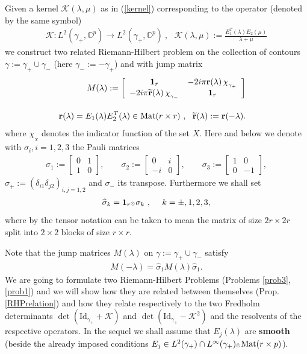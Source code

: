 \documentclass{article}
\def\ot{\hbox{\resizebox{6pt}{!}{$ \otimes \,
$}}}
\def\r{ {\mathbf r}}
\def \C{{\mathbf C}}
\def \K{{\mathcal K}}
\def\s{\sigma}
\def\C{{\mathbb C}}
\def\&{&\hspace{-20pt}}
\def\1{\mathbf 1}
\def\wh{\widehat}
\def\wt{\widetilde}
\def\Id{\mathrm{Id}}
\def\Mat{\mathrm{Mat}}
\newcommand{\be}{\begin{eqnarray}}
\newcommand{\ee}{\end{eqnarray}}
\def\le{\left}
\def\ri{\right}
\begin{document}
Given a kernel $\K(\lambda,\mu)$ as in (\ref{kernel}) corresponding to the operator  (denoted by the same symbol)
\be
\K:L^2(\gamma_+,\C^p) \to L^2(\gamma_+,\C^p)\ ,\ \ \ \K(\lambda,\mu):=\frac{ E_1^T(\lambda)E_2(\mu)}{\lambda + \mu} 
\ee
we construct two related Riemann-Hilbert problem on the collection of contours $\gamma:=\gamma_+\cup\gamma_-$ (here $\gamma_-:=-\gamma_+$) and with jump matrix
\be
&\& M(\lambda):= \le[
\begin{array}{cc}
\1_r &-
2i\pi \r(\lambda)\,\chi_{_{\gamma_+}}\\ 
-
2i\pi \wt \r (\lambda)\,\chi_{_{\gamma_-}} &  \1_r
\end{array}
\ri]
\label{3.1}\\[10pt]
&\& \r(\lambda) =
 E_1(\lambda)E_2^T(\lambda)\in \Mat(r\times r)\ ,\ \ \wt \r(\lambda):= \r(-\lambda).
\ee
where $\chi_{_X}$ denotes the indicator function of the set $X$. Here and below we denote with $\sigma_i,i=1,2,3$ the Pauli matrices
\be
\sigma_1:=\le[\begin{array}{cc}0 & 1\\
					1 & 0\end{array}\ri],\quad\quad\sigma_2:=\le[\begin{array}{cc}0 & i\\
					-i & 0\end{array}\ri],\quad\quad
					\sigma_3:=\le[\begin{array}{cc}1 & 0\\
					0 & -1\end{array}\ri],
\nonumber\ee 
$\sigma_+:=(\delta_{i1}\delta_{j2})_{i,j=1,2}$ and $\sigma_-$ its transpose. Furthermore we shall set 
 \be
 \wh \s_k  = \1_r \ot  \s_k\ ,\ \ \ \ k=\pm, 1,2,3,
 \ee
 where by the tensor notation can be taken to mean the matrix of size $2r\times 2r$ split into $2\times 2$ blocks of size $r\times r$.

Note that the  jump matrices $M(\lambda)$ on $\gamma := \gamma_+ \cup \gamma_-$ satisfy
\be
M(-\lambda) = \wh \s_1 M(\lambda) \wh \s_1.\label{32}
\ee
We are going to formulate  two Riemann-Hilbert Problems (Problems  \ref{prob3}, \ref{prob1}) and we will show how they are related between themselves (Prop. \ref{RHPrelation}) and how they relate respectively to the two Fredholm determinants $\det(\Id_{\gamma_+} + \K)$ and $\det(\Id_{\gamma_+}-\K^2)$ and the resolvents of the respective operators. 
In the sequel we shall assume that $E_j(\lambda)$ are  {\bf smooth} (beside the already imposed conditions $E_j \in L^2(\gamma_+ )\cap L^\infty(\gamma_+) \ot  \Mat(r\times p)$).
 
\end{document}
